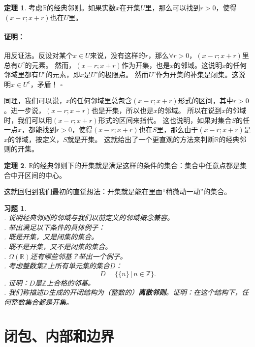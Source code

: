 \documentclass[12pt,UTF8]{ctexbook}
\theoremstyle{definition}
\newtheorem{tm}{定理}[section]
\theoremstyle{plain}
\newtheorem{xt}{习题}[section]
\renewenvironment{proof}{\paragraph{\textbf{证明：}}}{\hfill$\square$}
\begin{document}
\begin{appendix}
\begin{tm}\label{tm:a-1-30}
    考虑$\mathbb{R}$的经典邻则。如果实数$x$在开集$U$里，那么可以找到$r>0$，使得$(x-r;x+r)$也在$U$里。
\end{tm}

\begin{proof}
    用反证法。反设对某个$x\in U$来说，没有这样的$r$，那么$\forall r>0$，$(x-r;x+r)$里总有$U^c$的元素。
    然而，$(x-r;x+r)$作为开集，也是$x$的邻域。这说明$x$的任何邻域里都有$U^c$的元素，即$x$是$U^c$的极限点。
    然而$U^c$作为开集的补集是闭集。这说明$x\in U^c$，矛盾！
\end{proof}

同理，我们可以说，$x$的任何邻域里总包含$(x-r;x+r)$形式的区间，其中$r>0$。进一步说，$(x-r;x+r)$也是开集，所以也是$x$的邻域。
所以在说到$x$的邻域时，我们可以用$(x-r;x+r)$形式的区间来指代。
这也说明，如果对集合$S$的任一点$x$，都能找到$r>0$，使得$(x-r;x+r)$也在$S$里，那么由于$(x-r;x+r)$是$x$的邻域，按定义，$S$就是开集。
这就给出了一个更直观的方法来判断$\mathbb{R}$的经典邻则的开集。

\begin{tm}\label{tm:a-1-40}
    $\mathbb{R}$的经典邻则下的开集就是满足这样的条件的集合：集合中任意点都是集合中开区间的中心。
\end{tm}
这就回归到我们最初的直觉想法：开集就是能在里面“稍微动一动”的集合。

\begin{xt}
    \mbox{} \\
    . 说明经典邻则的邻域与我们以前定义的邻域概念兼容。\\
    . 举出满足以下条件的具体例子：\\
    . 既是开集，又是闭集的集合。\\
    . 既不是开集，又不是闭集的集合。\\
    . $\Omega(\mathbb{R})$还有哪些邻基？举出一个例子。\\
    . 考虑整数集$\mathbb{Z}$上所有单元集的集合$D$：
    $$ D = \{\{n\} \, | \, n \in  \mathbb{Z}\}.$$
    . 证明：$D$是$\mathbb{Z}$上合格的邻基。\\
    . 我们称描述$D$生成的开闭结构为（整数的）\textbf{离散邻则}。证明：在这个结构下，任何整数集合都是开集。
\end{xt}

\section{闭包、内部和边界}


\end{appendix}
\end{document}
